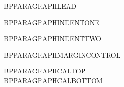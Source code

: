 \documentclass{abntexto-ufc}
\begin{document}
\textual

BPPARAGRAPHLEAD

BPPARAGRAPHINDENTONE

BPPARAGRAPHINDENTTWO

\vspace{4\baselineskip}
\noindent BPPARAGRAPHMARGINCONTROL

\vspace{2\baselineskip}
\noindent BPPARAGRAPHCALTOP\\
BPPARAGRAPHCALBOTTOM
\end{document}
